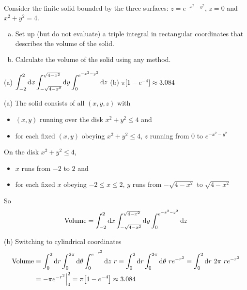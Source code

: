 \begin{question} [M200 2001A] %
Consider the finite solid bounded by the three surfaces:
$z=e^{-x^2-y^2}$, $z=0$ and $x^2+y^2=4$.
\begin{enumerate}[(a)]
\item 
Set up (but do not evaluate) a triple integral in rectangular
coordinates that describes the volume of the solid.

\item
Calculate the volume of the solid using any method.
\end{enumerate}
\end{question}

%

\begin{answer}
(a) $\displaystyle\int_{-2}^2 \mathrm{d}x
    \int_{-\sqrt{4-x^2}}^{\sqrt{4-x^2}}\mathrm{d}y\int_0^{e^{-x^2-y^2}}\mathrm{d}z$
\qquad
(b) $\pi\big[1-e^{-4}\big]\approx 3.084$
\end{answer}

\begin{solution}
(a) The solid consists of all $(x,y,z)$ with
\begin{itemize}
\item
$(x,y)$ running over the disk $x^2+y^2\le 4$ and
\item
for each fixed $(x,y)$ obeying $x^2+y^2\le 4$, $z$ running from
$0$ to $e^{-x^2-y^2}$
\end{itemize}
On the disk $x^2+y^2\le 4$,
\begin{itemize}
\item
$x$ runs from $-2$ to $2$ and
\item
for each fixed $x$ obeying $-2\le x\le 2$, $y$ runs from
$-\sqrt{4-x^2}$ to $\sqrt{4-x^2}$
\end{itemize}
So
\begin{equation*}
\text{Volume}=\int_{-2}^2 \mathrm{d}x
    \int_{-\sqrt{4-x^2}}^{\sqrt{4-x^2}}\mathrm{d}y\int_0^{e^{-x^2-y^2}}\mathrm{d}z
\end{equation*}

(b) Switching to cylindrical coordinates
\begin{align*}
\text{Volume}&=\int_0^2 \mathrm{d}r\int_0^{2\pi}\mathrm{d}\theta \int_0^{e^{-r^2}}\mathrm{d}z\ r
=\int_0^2 \mathrm{d}r\int_0^{2\pi}\mathrm{d}\theta \ r e^{-r^2}
=\int_0^2 \mathrm{d}r\ 2\pi\ r e^{-r^2} \\
&=-\pi e^{-r^2}\Big|_0^2
=\pi\big[1-e^{-4}\big]\approx 3.084
\end{align*}
\end{solution}

